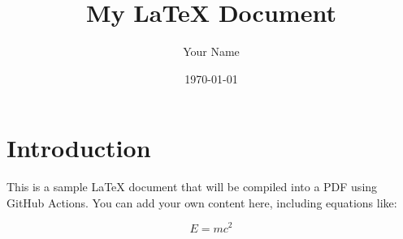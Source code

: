 \documentclass[a4paper,12pt]{article}
\begin{document}
\title{My LaTeX Document}
\author{Your Name}
\date{\today}
\maketitle

\section{Introduction}
This is a sample LaTeX document that will be compiled into a PDF using GitHub Actions. You can add your own content here, including equations like:

\begin{equation}
E = mc^2
\end{equation}

\end{document}
